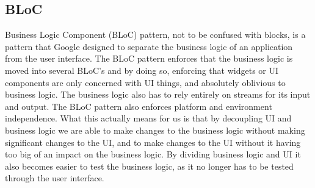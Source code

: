 \subsection{BLoC}
Business Logic Component (BLoC) pattern, not to be confused with blocks, is a pattern that Google designed to separate the business logic of an application from the user interface.
The BLoC pattern enforces that the business logic is moved into several BLoC's and by doing so, enforcing that widgets or UI components are only concerned with UI things, and absolutely oblivious to business logic. 
The business logic also has to rely entirely on streams for its input and output.
The BLoC pattern also enforces platform and environment independence. 
What this actually means for us is that by decoupling UI and business logic we are able to make changes to the business logic without making significant changes to the UI, and to make changes to the UI without it having too big of an impact on the business logic. 
By dividing business logic and UI it also becomes easier to test the business logic, as it no longer has to be tested through the user interface. 
